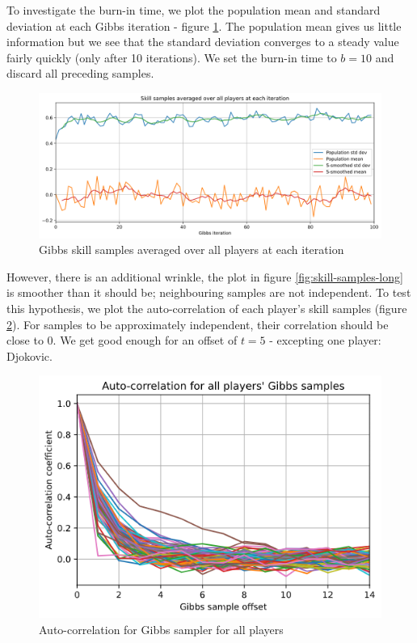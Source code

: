 \documentclass[]{article}
\newcommand{\figwidth}{0.6\linewidth}
\begin{document}
To investigate the burn-in time, we plot the population mean and standard deviation at each Gibbs iteration - figure \ref{fig:burn-in}. The population mean gives us little information but we see that the standard deviation converges to a steady value fairly quickly (only after 10 iterations). We set the burn-in time to $b=10$ and discard all preceding samples. 

\begin{figure}[!h]
	\centering
	\includegraphics[width=0.8\linewidth]{burn-in.png}
	\caption{Gibbs skill samples averaged over all players at each iteration}
	\label{fig:burn-in}
\end{figure}

However, there is an additional wrinkle, the plot in figure \ref{fig:skill-samples-long} is smoother than it should be; neighbouring samples are not independent. To test this hypothesis, we plot the auto-correlation of each player's skill samples (figure \ref{fig:auto-cor}). For samples to be approximately independent, their correlation should be close to 0. We get good enough for an offset of $t=5$ - excepting one player: Djokovic.

\begin{figure}[!h]
	\centering
	\includegraphics[width=\figwidth]{auto-cor.png}
	\caption{Auto-correlation for Gibbs sampler for all players}
	\label{fig:auto-cor}
\end{figure}
\end{document}
